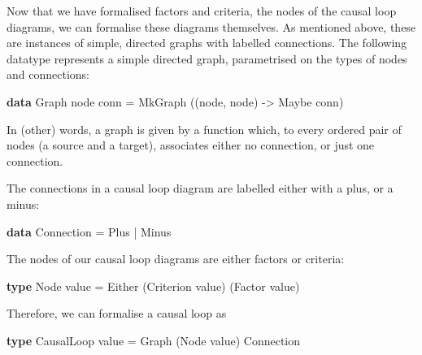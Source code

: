 \documentclass[]{article}
\newenvironment{Shaded}{}{}
\newcommand{\KeywordTok}[1]{\textcolor[rgb]{0.00,0.44,0.13}{\textbf{{#1}}}}
\newcommand{\DataTypeTok}[1]{\textcolor[rgb]{0.56,0.13,0.00}{{#1}}}
\newcommand{\OtherTok}[1]{\textcolor[rgb]{0.00,0.44,0.13}{{#1}}}
\newcommand{\FunctionTok}[1]{\textcolor[rgb]{0.02,0.16,0.49}{{#1}}}
\newcommand{\NormalTok}[1]{{#1}}
\begin{document}
Now that we have formalised factors and criteria, the nodes of the
causal loop diagrams, we can formalise these diagrams themselves. As
mentioned above, these are instances of simple, directed graphs with
labelled connections. The following datatype represents a simple
directed graph, parametrised on the types of nodes and connections:

\begin{Shaded}
\begin{Highlighting}[]
\KeywordTok{data} \DataTypeTok{Graph} \NormalTok{node conn  }\FunctionTok{=}  \DataTypeTok{MkGraph} \NormalTok{((node, node) }\OtherTok{->} \DataTypeTok{Maybe} \NormalTok{conn)}
\end{Highlighting}
\end{Shaded}

In (other) words, a graph is given by a function which, to every ordered
pair of nodes (a source and a target), associates either no connection,
or just one connection.

The connections in a causal loop diagram are labelled either with a
plus, or a minus:

\begin{Shaded}
\begin{Highlighting}[]
\KeywordTok{data} \DataTypeTok{Connection}       \FunctionTok{=}  \DataTypeTok{Plus} \FunctionTok{|} \DataTypeTok{Minus}
\end{Highlighting}
\end{Shaded}

The nodes of our causal loop diagrams are either factors or criteria:

\begin{Shaded}
\begin{Highlighting}[]
\KeywordTok{type} \DataTypeTok{Node} \NormalTok{value       }\FunctionTok{=}  \DataTypeTok{Either} \NormalTok{(}\DataTypeTok{Criterion} \NormalTok{value) (}\DataTypeTok{Factor} \NormalTok{value)}
\end{Highlighting}
\end{Shaded}

Therefore, we can formalise a causal loop as

\begin{Shaded}
\begin{Highlighting}[]
\KeywordTok{type} \DataTypeTok{CausalLoop} \NormalTok{value  }\FunctionTok{=}  \DataTypeTok{Graph} \NormalTok{(}\DataTypeTok{Node} \NormalTok{value) }\DataTypeTok{Connection}
\end{Highlighting}
\end{Shaded}
\end{document}
